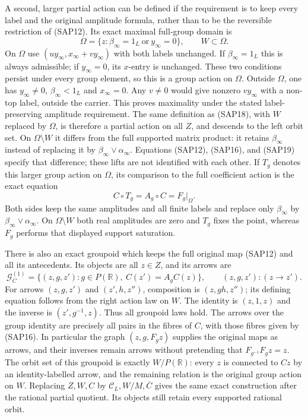 A second, larger partial action can be defined if the requirement
is to keep every label and the original amplitude formula, rather
than to be the reversible restriction of (SAP12). Its exact
maximal full-group domain is
\begin{equation}\tag{SAP19}
\Omega=\{z:\beta_\infty=1_L\ \text{or}\ y_\infty=0\},
\qquad W\subset\Omega.
\end{equation}
On $\Omega$ use $(u y_\infty,x_\infty+v y_\infty)$ with both
labels unchanged. If $\beta_\infty=1_L$ this is always
admissible; if $y_\infty=0$, its $x$-entry is unchanged. These
two conditions persist under every group element, so this is
a group action on $\Omega$. Outside $\Omega$, one has
$y_\infty\ne0$, $\beta_\infty<1_L$ and $x_\infty=0$.
Any $v\ne0$ would give nonzero $v y_\infty$ with a non-top
label, outside the carrier. This proves maximality under the
stated label-preserving amplitude requirement. The same definition
as (SAP18), with $W$ replaced by $\Omega$, is therefore a
partial action on all $Z$, and descends to the left orbit set.
On $\Omega\setminus W$ it differs from the full supported
matrix product: it retains $\beta_\infty$ instead of replacing
it by $\beta_\infty\vee\alpha_\infty$. Equations (SAP12),
(SAP16), and (SAP19) specify that difference; these lifts are
not identified with each other.
If $T_g$ denotes this larger group action on $\Omega$, its
comparison to the full coefficient action is the exact equation
\begin{equation}\tag{SAP19a}
C\circ T_g=A_g\circ C=F_g|_\Omega.
\end{equation}
Both sides keep the same amplitudes and all finite labels and
replace only $\beta_\infty$ by $\beta_\infty\vee\alpha_\infty$.
On $\Omega\setminus W$ both real amplitudes are zero and
$T_g$ fixes the point, whereas $F_g$ performs that displayed
support saturation.

There is also an exact groupoid which keeps the full original
map (SAP12) and all its antecedents. Its objects are all $z\in Z$,
and its arrows are
\begin{equation}\tag{SAP20}
\mathcal G_C^{(1)}
 =\{(z,g,z'):g\in P(\mathbb R),\ C(z')=A_gC(z)\},
\qquad (z,g,z'):(z\longrightarrow z').
\end{equation}
For arrows $(z,g,z')$ and $(z',h,z'')$, composition is
$(z,gh,z'')$; its defining equation follows from the right
action law on $W$. The identity is $(z,1,z)$ and the inverse
is $(z',g^{-1},z)$. Thus all groupoid laws hold. The arrows
over the group identity are precisely all pairs in the fibres
of $C$, with those fibres given by (SAP16). In particular the
graph $(z,g,F_gz)$ supplies the original maps as arrows, and
their inverses remain arrows without pretending that
$F_{g^{-1}}F_gz=z$. The orbit set of this groupoid is exactly
$W/P(\mathbb R)$: every $z$ is connected to $Cz$ by an
identity-labelled arrow, and the remaining relation is the
original group action on $W$. Replacing $Z,W,C$ by
$\mathscr C_L,W/M,\overline C$ gives the same exact construction
after the rational partial quotient. Its objects still retain
every supported rational orbit.

